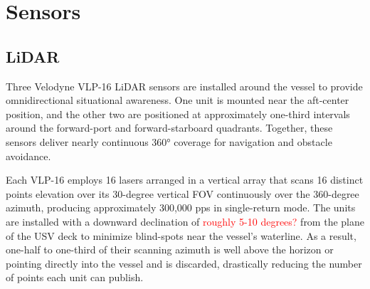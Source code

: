 \documentclass{erauthesis}
\begin{document}
\section{Sensors} \label{sensors}


\subsection{LiDAR} \label{sensors_LiDAR}


Three Velodyne VLP-16 \ac{LiDAR} sensors are installed around the vessel to provide omnidirectional situational awareness. 
One unit is mounted near the aft-center position, and the other two are positioned at approximately one-third intervals around the forward-port and forward-starboard quadrants. 
Together, these sensors deliver nearly continuous 360° coverage for navigation and obstacle avoidance.

Each VLP-16 employs 16 lasers arranged in a vertical array that scans 16 distinct points elevation over its 30-degree vertical \ac{FOV} continuously over the 360-degree azimuth, producing approximately 300,000 \ac{pps} in single-return mode. 
The units are installed with a downward declination of \textcolor{red}{roughly 5-10 degrees?} from the plane of the \ac{USV} deck to minimize blind-spots near the vessel's waterline.
As a result, one-half to one-third of their scanning azimuth is well above the horizon or pointing directly into the vessel and is discarded, drastically reducing the number of points each unit can publish.
\end{document}
